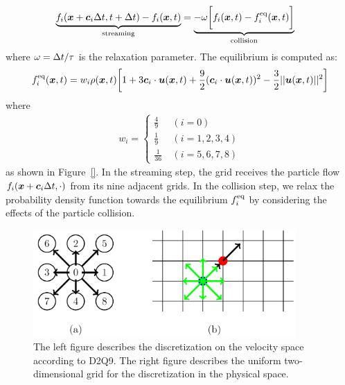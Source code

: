 \begin{equation}
\begin{aligned}
  \underbrace{f_i(\boldsymbol{x} + \boldsymbol{c}_i\Delta t , t + \Delta t) - f_i(\boldsymbol{x}, t)}_{
    \text{streaming}
  } &= 
  \underbrace{- \omega 
  \biggl[
    f_i(\boldsymbol{x}, t) -
    f^{\rm eq}_i(\boldsymbol{x}, t)
  \biggl]}_{
    \text{collision}
  }
\end{aligned}
\label{discretized-eq}
\end{equation}
where $\omega = \Delta t / \tau$ is the relaxation parameter.
The equilibrium is computed as\cite{}:
\begin{equation}
\begin{aligned}
  f^{\rm eq}_i(\boldsymbol{x}, t) &=
  w_i \rho(\boldsymbol{x}, t) \biggl[
    1 + 3 \boldsymbol{c}_i \cdot \boldsymbol{u}(\boldsymbol{x}, t) +
    \frac{9}{2}(\boldsymbol{c}_i \cdot \boldsymbol{u}(\boldsymbol{x}, t))^2
    -\frac{3}{2} || \boldsymbol{u}(\boldsymbol{x}, t) ||^2
  \biggr] \\
\end{aligned}
\end{equation}
where 
\begin{eqnarray}
  w_i = \left\{
  \begin{array}{cl}
     \frac{4}{9}&~(i = 0) \\
     \frac{1}{9}&~(i=1,2,3,4) \\
     \frac{1}{36}&~(i=5,6,7,8)
  \end{array}
  \right.
\end{eqnarray}
as shown in Figure~\ref{}.
In the streaming step, the grid receives 
the particle flow $f_i(\boldsymbol{x} + \boldsymbol{c}_i \Delta t, \cdot)$
from its nine adjacent grids.
In the collision step,
we relax the probability density function 
towards the equilibrium $f_i^{\rm eq}$
by considering the effects of the particle collision.


\begin{figure}[h!]
  \begin{center}
   \includegraphics[width=10cm]{logos/Gitter_LBM.png}
   \caption{
      The left figure describes
      the discretization on the velocity space according to D2Q9.
      The right figure describes the
      uniform two-dimensional grid for
      the discretization in the physical space.
   }
  \label{fig:d2q9}
  \end{center}
\end{figure}


